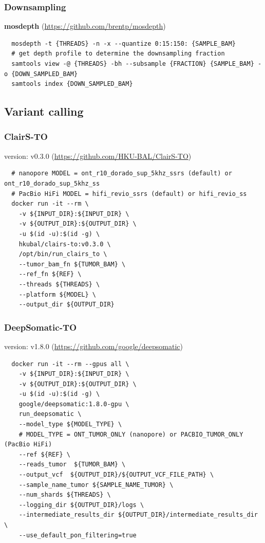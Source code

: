\documentclass[pdflatex,sn-nature]{sn-jnl}
\begin{document}
\subsubsection{Downsampling}
\label{supp:downsampling}
\textbf{mosdepth} (\url{https://github.com/brentp/mosdepth})
\begin{verbatim}
  mosdepth -t {THREADS} -n -x --quantize 0:15:150: {SAMPLE_BAM}
  # get depth profile to determine the downsampling fraction
  samtools view -@ {THREADS} -bh --subsample {FRACTION} {SAMPLE_BAM} -o {DOWN_SAMPLED_BAM}
  samtools index {DOWN_SAMPLED_BAM}
\end{verbatim}

\subsection{Variant calling}
\subsubsection{ClairS-TO}
version: v0.3.0 (\url{https://github.com/HKU-BAL/ClairS-TO})
\label{supp:clairsto}
\begin{verbatim}
  # nanopore MODEL = ont_r10_dorado_sup_5khz_ssrs (default) or ont_r10_dorado_sup_5khz_ss
  # PacBio HiFi MODEL = hifi_revio_ssrs (default) or hifi_revio_ss
  docker run -it --rm \
    -v ${INPUT_DIR}:${INPUT_DIR} \
    -v ${OUTPUT_DIR}:${OUTPUT_DIR} \
    -u $(id -u):$(id -g) \
    hkubal/clairs-to:v0.3.0 \
    /opt/bin/run_clairs_to \
    --tumor_bam_fn ${TUMOR_BAM} \
    --ref_fn ${REF} \
    --threads ${THREADS} \
    --platform ${MODEL} \
    --output_dir ${OUTPUT_DIR}
\end{verbatim}

\subsubsection{DeepSomatic-TO}
version: v1.8.0 (\url{https://github.com/google/deepsomatic})
\label{supp:deepsomatic}
\begin{verbatim}
  docker run -it --rm --gpus all \
    -v ${INPUT_DIR}:${INPUT_DIR} \
    -v ${OUTPUT_DIR}:${OUTPUT_DIR} \
    -u $(id -u):$(id -g) \
    google/deepsomatic:1.8.0-gpu \
    run_deepsomatic \
    --model_type ${MODEL_TYPE} \
    # MODEL_TYPE = ONT_TUMOR_ONLY (nanopore) or PACBIO_TUMOR_ONLY (PacBio HiFi)
    --ref ${REF} \
    --reads_tumor  ${TUMOR_BAM} \
    --output_vcf  ${OUTPUT_DIR}/${OUTPUT_VCF_FILE_PATH} \
    --sample_name_tumor ${SAMPLE_NAME_TUMOR} \
    --num_shards ${THREADS} \
    --logging_dir ${OUTPUT_DIR}/logs \
    --intermediate_results_dir ${OUTPUT_DIR}/intermediate_results_dir \
    --use_default_pon_filtering=true
\end{verbatim}
\end{document}
